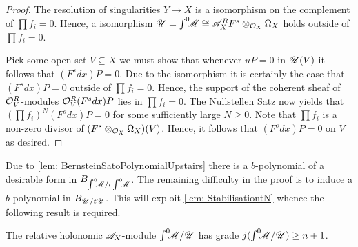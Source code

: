 \begin{proof}
   The resolution of singularities $Y\to X$ is a isomorphism on the complement of $\prod f_i = 0$. Hence, a isomorphism $\mathscr{U} = \int^0 \mkern -8mu \mathscr{M} \cong  \mathscr{A}_X^RF^s  \otimes_{\mathcal{O}_X}\Omega_X$ holds outside of $\prod f_i = 0$.

  Pick some open set $V\subseteq X$ we must show that whenever $uP = 0$ in $\mathscr{U}(V)$ it follows that $(F^s dx)P = 0$.
  Due to the isomorphism it is certainly the case that $(F^s dx) P = 0$ outside of $\prod f_i = 0$.
  Hence, the support of the coherent sheaf of $\mathcal{O}_V^R$-modules $\mathcal{O}_V^R (F^s dx) P $ lies in $\prod f_i = 0$.
  The Nullstellen Satz now yields that $(\prod f_i)^N (F^s dx) P  = 0$ for some sufficiently large $N\geq 0$.
  Note that $\prod f_i$ is a non-zero divisor of $(F^s\otimes_{\mathcal{O}_X} \Omega_X)(V)$. Hence, it follows that $(F^s dx) P= 0$ on $V$ as desired.
\end{proof}
Due to  \cref{lem: BernsteinSatoPolynomialUpstairs} there is a $b$-polynomial of a desirable form in $B_{\int^0 \mkern -8mu \mathscr{M}/t\int^0 \mkern -8mu\mathscr{M}}$.
The remaining difficulty in the proof is to induce a $b$-polynomial in $B_{\mathscr{U}/t\mathscr{U}}$. This will exploit \cref{lem: StabilisationtN} whence the following result is required.
\begin{lemma}
  The relative holonomic $\mathscr{A}_X$-module $\int^0 \mkern -8mu\mathscr{M}/\mathscr{U}$ has grade $j(\int^0 \mkern -8mu\mathscr{M}/\mathscr{U})\geq n+1$.
\end{lemma}
